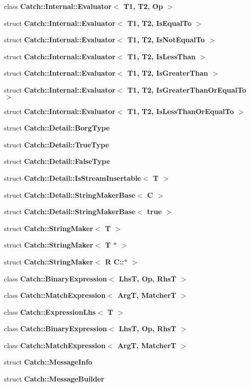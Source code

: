 \begin{DoxyCompactItemize}
class \textbf{ Catch\+::\+Internal\+::\+Evaluator$<$ T1, T2, Op $>$}
\item 
struct \textbf{ Catch\+::\+Internal\+::\+Evaluator$<$ T1, T2, Is\+Equal\+To $>$}
\item 
struct \textbf{ Catch\+::\+Internal\+::\+Evaluator$<$ T1, T2, Is\+Not\+Equal\+To $>$}
\item 
struct \textbf{ Catch\+::\+Internal\+::\+Evaluator$<$ T1, T2, Is\+Less\+Than $>$}
\item 
struct \textbf{ Catch\+::\+Internal\+::\+Evaluator$<$ T1, T2, Is\+Greater\+Than $>$}
\item 
struct \textbf{ Catch\+::\+Internal\+::\+Evaluator$<$ T1, T2, Is\+Greater\+Than\+Or\+Equal\+To $>$}
\item 
struct \textbf{ Catch\+::\+Internal\+::\+Evaluator$<$ T1, T2, Is\+Less\+Than\+Or\+Equal\+To $>$}
\item 
struct \textbf{ Catch\+::\+Detail\+::\+Borg\+Type}
\item 
struct \textbf{ Catch\+::\+Detail\+::\+True\+Type}
\item 
struct \textbf{ Catch\+::\+Detail\+::\+False\+Type}
\item 
struct \textbf{ Catch\+::\+Detail\+::\+Is\+Stream\+Insertable$<$ T $>$}
\item 
struct \textbf{ Catch\+::\+Detail\+::\+String\+Maker\+Base$<$ C $>$}
\item 
struct \textbf{ Catch\+::\+Detail\+::\+String\+Maker\+Base$<$ true $>$}
\item 
struct \textbf{ Catch\+::\+String\+Maker$<$ T $>$}
\item 
struct \textbf{ Catch\+::\+String\+Maker$<$ T $\ast$ $>$}
\item 
struct \textbf{ Catch\+::\+String\+Maker$<$ R C\+::$\ast$ $>$}
\item 
class \textbf{ Catch\+::\+Binary\+Expression$<$ Lhs\+T, Op, Rhs\+T $>$}
\item 
class \textbf{ Catch\+::\+Match\+Expression$<$ Arg\+T, Matcher\+T $>$}
\item 
class \textbf{ Catch\+::\+Expression\+Lhs$<$ T $>$}
\item 
class \textbf{ Catch\+::\+Binary\+Expression$<$ Lhs\+T, Op, Rhs\+T $>$}
\item 
class \textbf{ Catch\+::\+Match\+Expression$<$ Arg\+T, Matcher\+T $>$}
\item 
struct \textbf{ Catch\+::\+Message\+Info}
\item 
struct \textbf{ Catch\+::\+Message\+Builder}
\item 

\end{DoxyCompactItemize}

